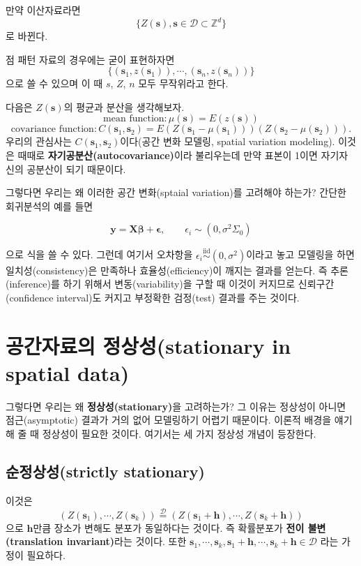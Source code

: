 \documentclass[b5paper,]{scrbook}
\theoremstyle{plain}
\theoremstyle{definition}
\numberwithin{equation}{section}
\begin{document}
만약 이산자료라면
\[\{Z (\mathbf{s}), \mathbf{s} \in \mathcal{D} \subset \mathbb{Z}^{d} \} \]
로 바뀐다.

점 패턴 자료의 경우에는 굳이 표현하자면
\[\{ (\mathbf{s}_{1},z(\mathbf{s}_{1})), \cdots , (\mathbf{s}_{n},z(\mathbf{s}_{n}))  \} \]
으로 쓸 수 있으며 이 때 \(s\), \(Z\), \(n\) 모두 무작위라고 한다.

다음은 \(Z(\mathbf{s})\)의 평균과 분산을 생각해보자.
\[\text{mean function}:\mu(\mathbf{s})=E(z(\mathbf{s}))\]
\[\text{covariance function}: C(\mathbf{s}_{1},\mathbf{s}_{2})=E(Z(\mathbf{s}_{1}-\mu(\mathbf{s}_{1})))(Z(\mathbf{s}_{2}-\mu(\mathbf{s}_{2}))).\]
우리의 관심사는 \(C(\mathbf{s}_{1},\mathbf{s}_{2})\)이다(공간 변화 모델링, spatial variation modeling). 이것은 때때로 \textbf{자기공분산(autocovariance)}이라 불리우는데 만약 표본이 1이면 자기자신의 공분산이 되기 때문이다.

그렇다면 우리는 왜 이러한 공간 변화(sptaial variation)를 고려해야 하는가? 간단한 회귀분석의 예를 들면

\[\mathbf{y}=\mathbf{X}\boldsymbol{\beta}+\boldsymbol{\epsilon}, \qquad{\epsilon_{i} \sim (0, \sigma^{2}\Sigma_{0})}\]

으로 식을 쓸 수 있다. 그런데 여기서 오차항을 \(\epsilon_{i} \stackrel{\text{iid}}{\sim} (0, \sigma^{2})\)이라고 놓고 모델링을 하면 일치성(consistency)은 만족하나 효율성(efficiency)이 깨지는 결과를 얻는다. 즉 추론(inference)를 하기 위해서 변동(variability)을 구할 때 이것이 커지므로 신뢰구간(confidence interval)도 커지고 부정확한 검정(test) 결과를 주는 것이다.

\hypertarget{-stationary-in-spatial-data}{%
\section{공간자료의 정상성(stationary in spatial data)}\label{-stationary-in-spatial-data}}

그렇다면 우리는 왜 \textbf{정상성(stationary)}을 고려하는가? 그 이유는 정상성이 아니면 점근(asymptotic) 결과가 거의 없어 모델링하기 어렵기 때문이다. 이론적 배경을 얘기해 줄 때 정상성이 필요한 것이다. 여기서는 세 가지 정상성 개념이 등장한다.

\hypertarget{strictly-stationary}{%
\subsection{순정상성(strictly stationary)}\label{strictly-stationary}}

이것은
\[(Z(\mathbf{s}_{1}), \cdots , Z(\mathbf{s}_{k})) \stackrel{\mathcal{D}}{=} (Z(\mathbf{s}_{1}+\mathbf{h}), \cdots , Z(\mathbf{s}_{k}+\mathbf{h}))\]
으로 \(\mathbf{h}\)만큼 장소가 변해도 분포가 동일하다는 것이다. 즉 확률분포가 \textbf{전이 불변(translation invariant)}라는 것이다. 또한 \(\mathbf{s}_{1}, \cdots , \mathbf{s}_{k}, \mathbf{s}_{1}+\mathbf{h}, \cdots , \mathbf{s}_{k}+\mathbf{h} \in \mathcal{D}\) 라는 가정이 필요하다.
\end{document}
